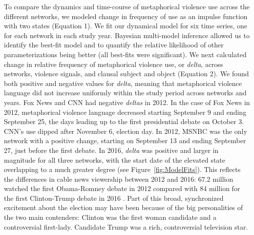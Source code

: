 To compare the dynamics and time-course of metaphorical violence use across the
different networks, we modeled change in frequency of use as an impulse function
with two states (Equation 1). We fit our dynamical
model for six time series, one for each network in each study year. Bayesian
multi-model inference allowed us to identify the best-fit model and to quantify
the relative likelihood of other parameterizations being better (all best-fits were
significant). We next calculated change in relative frequency of metaphorical
violence use, or \emph{delta}, across networks, violence signals, and clausal
subject and object (Equation 2). We found both positive and negative values for \emph{delta},
meaning that metaphorical violence language did not increase uniformly within
the study period across networks and years. Fox News and CNN had negative
\emph{deltas} in 2012. In the case of Fox News in 2012, metaphorical violence
language decreased starting September 9 and ending September 25, the days
leading up to the first presidential debate on October 3. CNN's use dipped after
November 6, election day. In 2012, MSNBC was the only network with a positive
change, starting on September 13 and ending September 27, just before the first
debate. In 2016, \emph{delta} was positive and larger in magnitude for all three
networks, with the start date of the elevated state overlapping to a much
greater degree (see Figure~\ref{fig:ModelFits}). This reflects the differences in cable news
viewership between 2012 and 2016: 67.2 million watched the first
Obama-Romney debate in 2012 compared with 84 million for the first Clinton-Trump
debate in 2016 \cite{Perlberg2016}.  Part of this broad, synchronized excitement about 
the election 	may have been because of the big personalities of the two main contenders: 
Clinton was the first woman candidate and a controversial
first-lady.  Candidate Trump was a rich, controversial television star.

